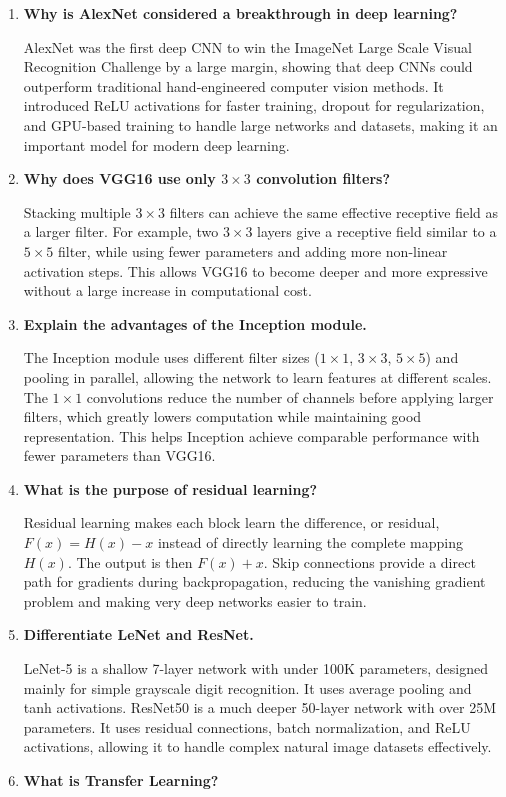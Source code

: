 \documentclass[11pt]{article}
\begin{document}
\begin{enumerate}

\item \textbf{Why is AlexNet considered a breakthrough in deep learning?}

AlexNet was the first deep CNN to win the ImageNet Large Scale Visual Recognition Challenge by a large margin, showing that deep CNNs could outperform traditional hand-engineered computer vision methods. It introduced ReLU activations for faster training, dropout for regularization, and GPU-based training to handle large networks and datasets, making it an important model for modern deep learning.\
\\
\item \textbf{Why does VGG16 use only $3\times3$ convolution filters?}

Stacking multiple $3\times3$ filters can achieve the same effective receptive field as a larger filter. For example, two $3\times3$ layers give a receptive field similar to a $5\times5$ filter, while using fewer parameters and adding more non-linear activation steps. This allows VGG16 to become deeper and more expressive without a large increase in computational cost.\
\\
\item \textbf{Explain the advantages of the Inception module.}

The Inception module uses different filter sizes ($1\times1$, $3\times3$, $5\times5$) and pooling in parallel, allowing the network to learn features at different scales. The $1\times1$ convolutions reduce the number of channels before applying larger filters, which greatly lowers computation while maintaining good representation. This helps Inception achieve comparable performance with fewer parameters than VGG16.\
\\
\item \textbf{What is the purpose of residual learning?}

Residual learning makes each block learn the difference, or residual, $F(x) = H(x) - x$ instead of directly learning the complete mapping $H(x)$. The output is then $F(x) + x$. Skip connections provide a direct path for gradients during backpropagation, reducing the vanishing gradient problem and making very deep networks easier to train.\
\\
\item \textbf{Differentiate LeNet and ResNet.}

LeNet-5 is a shallow 7-layer network with under 100K parameters, designed mainly for simple grayscale digit recognition. It uses average pooling and tanh activations. ResNet50 is a much deeper 50-layer network with over 25M parameters. It uses residual connections, batch normalization, and ReLU activations, allowing it to handle complex natural image datasets effectively.\
\\
\item \textbf{What is Transfer Learning?}


\end{enumerate}
\end{document}
